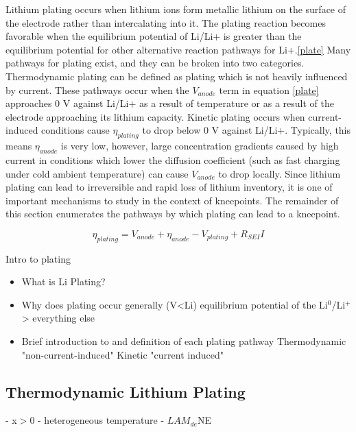 \documentclass{article}
\begin{document}
Lithium plating occurs when lithium ions form metallic lithium on the surface of the electrode rather than intercalating into it. The plating reaction becomes favorable when the equilibrium potential of Li/Li+ is greater than the equilibrium potential for other alternative reaction pathways for Li+.\ref{plate} Many pathways for plating exist, and they can be broken into two categories. Thermodynamic plating can be defined as plating which is not heavily influenced by current. These pathways occur when the $V_{anode}$ term in equation \ref{plate} approaches 0 V against Li/Li+ as a result of temperature\cite{wang_pnas} or as a result of the electrode approaching its lithium capacity. Kinetic plating occurs when current-induced conditions cause $\eta_{plating}$ to drop below 0 V against Li/Li+. Typically, this means $\eta_{anode}$ is very low, however, large concentration gradients caused by high current in conditions which lower the diffusion coefficient (such as fast charging under cold ambient temperature) can cause $V_{anode}$ to drop locally. Since lithium plating can lead to irreversible and rapid loss of lithium inventory, it is one of important mechanisms to study in the context of kneepoints. The remainder of this section enumerates the pathways by which plating can lead to a kneepoint. 

\begin{equation}
    \eta_{plating} = V_{anode}+\eta_{anode}-V_{plating}+R_{SEI}I
    \label{plate}
\end{equation}






Intro to plating
\begin{itemize}
    \item What is Li Plating?
    \item Why does plating occur generally (V<Li)
    equilibrium potential of the Li$\mathrm{^0}$/Li$\mathrm{^+}$ > everything else
    \item Brief introduction to and definition of each plating pathway
    \subitem Thermodynamic "non-current-induced"
    \subitem Kinetic "current induced"
\end{itemize}

\subsection{Thermodynamic Lithium Plating}

- x$>0$
- heterogeneous temperature
- ${LAM}_{de}$NE
\end{document}
